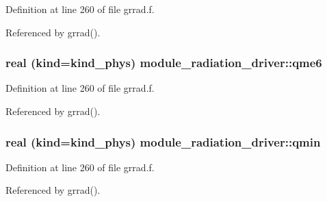 Definition at line 260 of file grrad.\+f.



Referenced by grrad().

\subsubsection[{\texorpdfstring{qme6}{qme6}}]{\setlength{\rightskip}{0pt plus 5cm}real (kind=kind\+\_\+phys) module\+\_\+radiation\+\_\+driver\+::qme6\hspace{0.3cm}{\ttfamily [private]}}\hypertarget{group__module__radiation__driver_ga4916e37c472b2f824b6f566ff67200cd}{}\label{group__module__radiation__driver_ga4916e37c472b2f824b6f566ff67200cd}


Definition at line 260 of file grrad.\+f.



Referenced by grrad().

\subsubsection[{\texorpdfstring{qmin}{qmin}}]{\setlength{\rightskip}{0pt plus 5cm}real (kind=kind\+\_\+phys) module\+\_\+radiation\+\_\+driver\+::qmin\hspace{0.3cm}{\ttfamily [private]}}\hypertarget{group__module__radiation__driver_gafdc2a7e1dbfb075ac33a2388564d9428}{}\label{group__module__radiation__driver_gafdc2a7e1dbfb075ac33a2388564d9428}


Definition at line 260 of file grrad.\+f.



Referenced by grrad().

